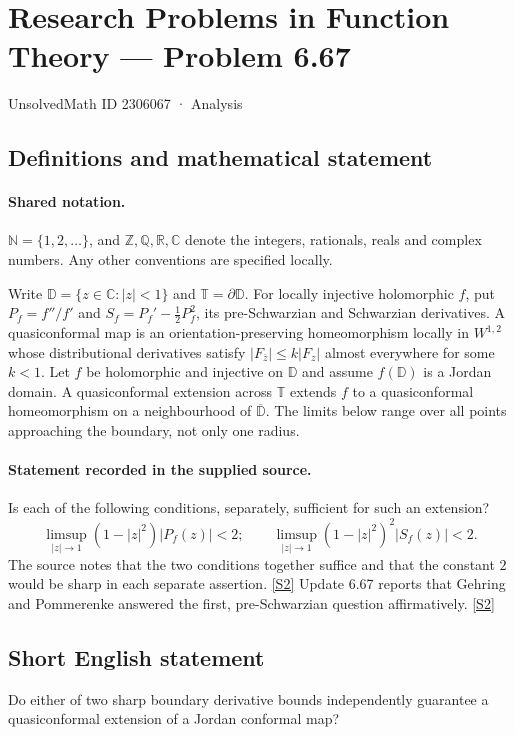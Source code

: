 \documentclass[11pt]{article}
\newcommand{\sref}[2]{\hyperlink{source:#1:#2}{[S#2]}}
\begin{document}
\setcounter{section}{2306066}
\section{Research Problems in Function Theory — Problem 6.67}\label{2306067}
{\small\sffamily UnsolvedMath ID 2306067 · Analysis}
\subsection{Definitions and mathematical statement}

\paragraph{Shared notation.}$\mathbb N=\{1,2,\ldots\}$, and $\mathbb Z,\mathbb Q,\mathbb R,\mathbb C$ denote the integers, rationals, reals and complex numbers. Any other conventions are specified locally.


Write $\mathbb D=\{z\in\mathbb C:|z|<1\}$ and $\mathbb T=\partial\mathbb D$. For locally injective holomorphic $f$, put $P_f=f''/f'$ and $S_f=P_f'-\tfrac12P_f^2$, its pre-Schwarzian and Schwarzian derivatives. A quasiconformal map is an orientation-preserving homeomorphism locally in $W^{1,2}$ whose distributional derivatives satisfy $|F_{\bar z}|\le k|F_z|$ almost everywhere for some $k<1$. Let $f$ be holomorphic and injective on $\mathbb D$ and assume $f(\mathbb D)$ is a Jordan domain. A quasiconformal extension across $\mathbb T$ extends $f$ to a quasiconformal homeomorphism on a neighbourhood of $\overline{\mathbb D}$. The limits below range over all points approaching the boundary, not only one radius.
\paragraph{Statement recorded in the supplied source.}
Is each of the following conditions, separately, sufficient for such an extension? \[\limsup_{|z|\to1}(1-|z|^2)|P_f(z)|<2;\qquad \limsup_{|z|\to1}(1-|z|^2)^2|S_f(z)|<2.\] The source notes that the two conditions together suffice and that the constant $2$ would be sharp in each separate assertion. \sref{2306067}{2}
Update 6.67 reports that Gehring and Pommerenke answered the first, pre-Schwarzian question affirmatively. \sref{2306067}{2}
\subsection{Short English statement}
Do either of two sharp boundary derivative bounds independently guarantee a quasiconformal extension of a Jordan conformal map?
\end{document}
